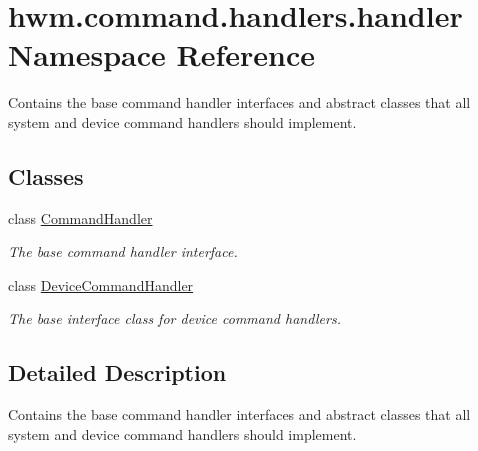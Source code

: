\hypertarget{namespacehwm_1_1command_1_1handlers_1_1handler}{\section{hwm.\-command.\-handlers.\-handler Namespace Reference}
\label{namespacehwm_1_1command_1_1handlers_1_1handler}
}


Contains the base command handler interfaces and abstract classes that all system and device command handlers should implement.  


\subsection*{Classes}
\begin{DoxyCompactItemize}
\item 
class \hyperlink{classhwm_1_1command_1_1handlers_1_1handler_1_1_command_handler}{Command\-Handler}
\begin{DoxyCompactList}\small\item\em The base command handler interface. \end{DoxyCompactList}\item 
class \hyperlink{classhwm_1_1command_1_1handlers_1_1handler_1_1_device_command_handler}{Device\-Command\-Handler}
\begin{DoxyCompactList}\small\item\em The base interface class for device command handlers. \end{DoxyCompactList}\end{DoxyCompactItemize}


\subsection{Detailed Description}
Contains the base command handler interfaces and abstract classes that all system and device command handlers should implement. 